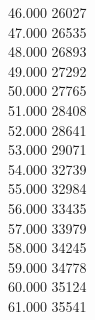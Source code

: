 { 46.000	26027 \\
 47.000	26535 \\
 48.000	26893 \\
 49.000	27292 \\
 50.000	27765 \\
 51.000	28408 \\
 52.000	28641 \\
 53.000	29071 \\
 54.000	32739 \\
 55.000	32984 \\
 56.000	33435 \\
 57.000	33979 \\
 58.000	34245 \\
 59.000	34778 \\
 60.000	35124 \\
 61.000	35541 \\
}
